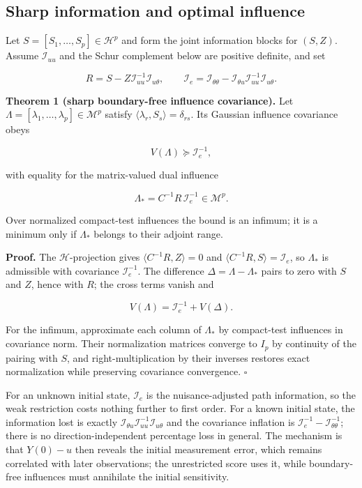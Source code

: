 \documentclass[ejs]{imsart}
\begin{document}
\subsection{Sharp information and optimal
influence}\label{sharp-information-and-optimal-influence}

Let \(S=[S_1,\ldots,S_p]\in\mathcal H^p\) and form the joint information
blocks for \((S,Z)\). Assume \(\mathcal I_{uu}\) and the Schur
complement below are positive definite, and set

\[
R=S-Z\mathcal I_{uu}^{-1}\mathcal I_{u\theta},
\qquad
\mathcal I_e=\mathcal I_{\theta\theta}
-\mathcal I_{\theta u}\mathcal I_{uu}^{-1}\mathcal I_{u\theta}.
\]

\textbf{Theorem 1 (sharp boundary-free influence covariance).} Let
\(\Lambda=[\lambda_1,\ldots,\lambda_p]\in\mathcal M^p\) satisfy
\(\langle\lambda_r,S_s\rangle=\delta_{rs}\). Its Gaussian influence
covariance obeys

\[
V(\Lambda)\succeq\mathcal I_e^{-1},
\]

with equality for the matrix-valued dual influence

\[
\Lambda_*=C^{-1}R\,\mathcal I_e^{-1}\in\mathcal M^p.
\]

Over normalized compact-test influences the bound is an infimum; it is a
minimum only if \(\Lambda_*\) belongs to their adjoint range.

\textbf{Proof.} The \(\mathcal H\)-projection gives
\(\langle C^{-1}R,Z\rangle=0\) and
\(\langle C^{-1}R,S\rangle=\mathcal I_e\), so \(\Lambda_*\) is
admissible with covariance \(\mathcal I_e^{-1}\). The difference
\(\Delta=\Lambda-\Lambda_*\) pairs to zero with \(S\) and \(Z\), hence
with \(R\); the cross terms vanish and

\[
V(\Lambda)=\mathcal I_e^{-1}+V(\Delta).
\]

For the infimum, approximate each column of \(\Lambda_*\) by
compact-test influences in covariance norm. Their normalization matrices
converge to \(I_p\) by continuity of the pairing with \(S\), and
right-multiplication by their inverses restores exact normalization
while preserving covariance convergence. \(\square\)

For an unknown initial state, \(\mathcal I_e\) is the nuisance-adjusted
path information, so the weak restriction costs nothing further to first
order. For a known initial state, the information lost is exactly
\(\mathcal I_{\theta u}\mathcal I_{uu}^{-1}\mathcal I_{u\theta}\) and
the covariance inflation is
\(\mathcal I_e^{-1}-\mathcal I_{\theta\theta}^{-1}\); there is no
direction-independent percentage loss in general. The mechanism is that
\(Y(0)-u\) then reveals the initial measurement error, which remains
correlated with later observations; the unrestricted score uses it,
while boundary-free influences must annihilate the initial sensitivity.
\end{document}
